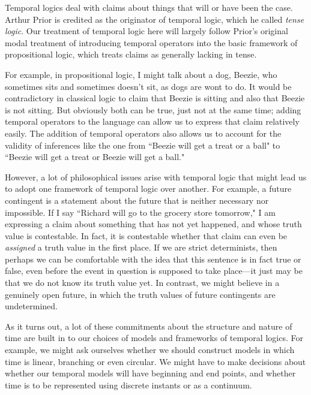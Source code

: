 \documentclass[../../../include/open-logic-section]{subfiles}
\begin{document}


Temporal logics deal with claims about things that will or have been the case. Arthur Prior is credited as the originator of temporal logic, which he called \emph{tense logic}. Our treatment of temporal logic here will largely follow Prior's original modal treatment of introducing temporal operators into the basic framework of propositional logic, which treats claims as generally lacking in tense.

For example, in propositional logic, I might talk about a dog, Beezie, who sometimes sits and sometimes doesn't sit, as dogs are wont to do. It would be contradictory in classical logic to claim that Beezie is sitting and also that Beezie is not sitting. But obviously both can be true, just not at the same time; adding temporal operators to the language can allow us to express that claim relatively easily. The addition of temporal operators also allows us to account for the validity of inferences like the one from ``Beezie will get a treat or a ball" to ``Beezie will get a treat or Beezie will get a ball." 

However, a lot of philosophical issues arise with temporal logic that might lead us to adopt one framework of temporal logic over another. For example, a future contingent is a statement about the future that is neither necessary nor impossible. If I say ``Richard will go to the grocery store tomorrow," I am expressing a claim about something that has not yet happened, and whose truth value is contestable. In fact, it is contestable whether that claim can even be \emph{assigned} a truth value in the first place. If we are strict determinists, then perhaps we can be comfortable with the idea that this sentence is in fact true or false, even before the event in question is supposed to take place---it just may be that we do not know its truth value yet. In contrast, we might believe in a genuinely open future, in which the truth values of future contingents are undetermined. 

As it turns out, a lot of these commitments about the structure and nature of time are built in to our choices of models and frameworks of temporal logics. For example, we might ask ourselves whether we should construct models in which time is linear, branching or even circular. We might have to make decisions about whether our temporal models will have beginning and end points, and whether time is to be represented using discrete instants or as a continuum. 
\end{document}
